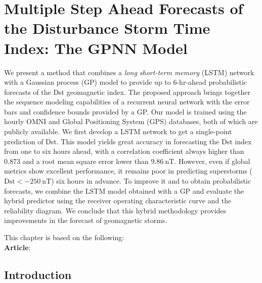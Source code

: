 \chapter{Multiple Step Ahead Forecasts of the Disturbance Storm Time Index: The GPNN Model}\label{chapter:dst_msa}

{\small
	We present a method that combines a \emph{long short-term memory} (LSTM) network with a 
	Gaussian process (GP) model to provide up to 6-hr-ahead probabilistic forecasts of the Dst 
	geomagnetic index. The proposed approach brings together the sequence modeling capabilities of 
	a recurrent neural network with the error bars and confidence bounds provided by a GP. Our 
	model is trained using the hourly OMNI and Global Positioning System (GPS) databases, both of 
	which are publicly available. We first develop a LSTM network to get a single-point prediction 
	of Dst. This model yields great accuracy in forecasting the Dst index from one to six hours 
	ahead, with a correlation coefficient always higher than $0.873$ and a root mean square error 
	lower than $\SI{9.86}{\nano\tesla}$. However, even if global metrics show excellent 
	performance, it remains poor in predicting superstorms 
	($\mathrm{Dst} < \SI{-250}{\nano\tesla}$) six hours in advance. To improve it and to obtain 
	probabilistic forecasts, we combine the LSTM model obtained with a GP and evaluate the hybrid 
	predictor using the receiver operating characteristic curve and the reliability diagram. We 
	conclude that this hybrid methodology provides improvements in the forecast of geomagnetic 
	storms.

}
	

\vfill
{}
\vfill

\noindent
	\parbox{\textwidth}{%
		{\small This chapter is based on the following:\\

		\textbf{Article}:\\
		}
    }%

\clearpage

\section{Introduction}

